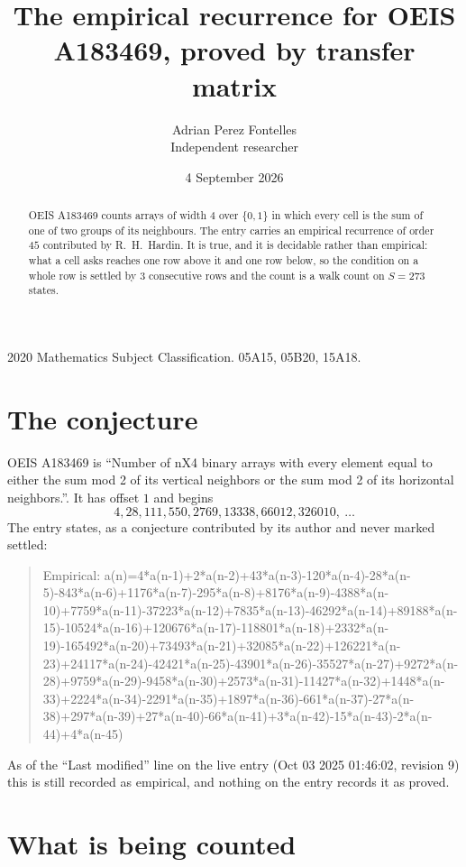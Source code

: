 \documentclass[11pt,a4paper]{article}
\title{The empirical recurrence for OEIS A183469, proved by transfer matrix}
\author{Adrian Perez Fontelles\\ \small Independent researcher}
\date{4 September 2026}
\theoremstyle{plain}
\theoremstyle{definition}
\begin{document}
\maketitle

\begin{abstract}
OEIS A183469 counts arrays of width $4$ over $\{0,1\}$ in which every cell is the sum of one of two groups of its neighbours. The entry carries an
empirical recurrence of order $45$ contributed by R.~H.~Hardin. It is true, and it is
decidable rather than empirical: what a cell asks reaches one row above
it and one row below, so the condition on a whole row is settled by
$3$ consecutive rows and the count is a walk count on $S=273$ states.
\end{abstract}

\noindent\small 2020 Mathematics Subject Classification. 05A15, 05B20, 15A18.\normalsize

\section{The conjecture}

OEIS A183469 is ``Number of nX4 binary arrays with every element equal to either the sum mod 2 of its vertical neighbors or the sum mod 2 of its horizontal neighbors.''. It has offset $1$ and begins
\[
4, 28, 111, 550, 2769, 13338, 66012, 326010,\ \dots
\]
The entry states, as a conjecture contributed by its author and never marked settled:
\begin{quote}
Empirical: a(n)=4*a(n-1)+2*a(n-2)+43*a(n-3)-120*a(n-4)-28*a(n-5)-843*a(n-6)+1176*a(n-7)-295*a(n-8)+8176*a(n-9)-4388*a(n-10)+7759*a(n-11)-37223*a(n-12)+7835*a(n-13)-46292*a(n-14)+89188*a(n-15)-10524*a(n-16)+120676*a(n-17)-118801*a(n-18)+2332*a(n-19)-165492*a(n-20)+73493*a(n-21)+32085*a(n-22)+126221*a(n-23)+24117*a(n-24)-42421*a(n-25)-43901*a(n-26)-35527*a(n-27)+9272*a(n-28)+9759*a(n-29)-9458*a(n-30)+2573*a(n-31)-11427*a(n-32)+1448*a(n-33)+2224*a(n-34)-2291*a(n-35)+1897*a(n-36)-661*a(n-37)-27*a(n-38)+297*a(n-39)+27*a(n-40)-66*a(n-41)+3*a(n-42)-15*a(n-43)-2*a(n-44)+4*a(n-45)
\end{quote}
As of the ``Last modified'' line on the live entry (Oct 03 2025 01:46:02, revision 9) this is still
recorded as empirical, and nothing on the entry records it as proved.

\section{What is being counted}
\end{document}
